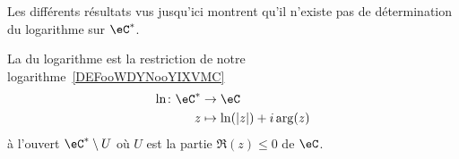 Les différents résultats vus jusqu'ici montrent qu'il n'existe pas de détermination du logarithme sur \( \eC^*\).

\begin{definition}
	La  du logarithme est la restriction de notre logarithme~\ref{DEFooWDYNooYIXVMC}
	\begin{equation}
		\begin{aligned}
			\ln\colon \eC^* & \to \eC                     \\
			z               & \mapsto \ln(| z |)+i\arg(z)
		\end{aligned}
	\end{equation}
	à l'ouvert \( \eC^*\setminus U\) où \( U\) est la partie \( \Re(z)\leq 0\) de \( \eC\).
\end{definition}

